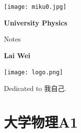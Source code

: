 \documentclass[
	12pt, %
	a4paper, %
]{myLegrandOrangeBook}
\begin{document}

\titlepage %
	{\texttt{[image: miku0.jpg]}} %
	{ %
		\centering\sffamily %
		{\Huge\bfseries University Physics\par} %
		\vspace{12pt} %
		{\LARGE Notes\par} %
		\vspace{20pt} %
		{\huge\bfseries Lai Wei\par} %
		\vspace{36pt} %
        {\texttt{[image: logo.png]}\par}
	}


    \begin{dedication}
        Dedicated to {\kaishu 我自己}.
    \end{dedication}


\pagestyle{empty} %

\tableofcontents %

\pagestyle{fancy} %

\cleardoublepage %


\part{大学物理A1}
\end{document}

